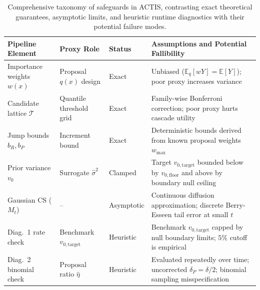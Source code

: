 \documentclass[11pt,a4paper]{article}
\begin{document}
\begin{table}[ht]
\centering
\small
\begin{tabular}{@{}p{2.8cm}p{2.4cm}p{2.0cm}p{7.4cm}@{}}
\toprule
\textbf{Pipeline Element} & \textbf{Proxy Role} & \textbf{Status} & \textbf{Assumptions and Potential Fallibility} \\ \midrule
Importance weights $w(x)$ & Proposal $q(x)$ design & Exact & Unbiased ($\mathbb{E}_q[wY] = \mathbb{E}[Y]$); poor proxy increases variance \\
Candidate lattice $\mathcal{T}$ & Quantile threshold grid & Exact & Family-wise Bonferroni correction; poor proxy hurts cascade utility \\
Jump bounds $b_R, b_P$ & Increment bound & Exact & Deterministic bounds derived from known proposal weights $w_{\max}$ \\
Prior variance $v_0$ & Surrogate $\hat{\sigma}^2$ & Clamped & Target $v_{0, \text{target}}$ bounded below by $v_{0, \text{floor}}$ and above by boundary null ceiling \\ \midrule
Gaussian CS ($M_t$) & -- & Asymptotic & Continuous diffusion approximation; discrete Berry-Esseen tail error at small $t$ \\
Diag.~1 rate check & Benchmark $v_{0, \text{target}}$ & Heuristic & Benchmark $v_{0, \text{target}}$ capped by null boundary limits; $5\%$ cutoff is empirical \\
Diag.~2 binomial check & Proposal ratio $\hat{\eta}$ & Heuristic & Evaluated repeatedly over time; uncorrected $\delta_P = \delta/2$; binomial sampling misspecification \\ \bottomrule
\end{tabular}
\caption{Comprehensive taxonomy of safeguards in ACTIS, contrasting exact theoretical guarantees, asymptotic limits, and heuristic runtime diagnostics with their potential failure modes.}
\label{tab:safeguard_taxonomy}
\end{table}
\end{document}
